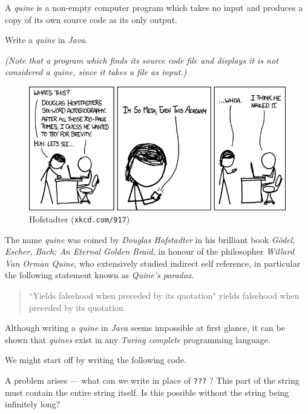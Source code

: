 

\problem A \textit{quine} is a non-empty computer program which takes no input and produces a copy of its own source code as its only
output.

Write a \textit{quine} in \textit{Java}.


\textit{(Note that a program which finds its source code file and displays it is not considered a \textit{quine}, since it takes a file as input.)}

\solution
\begin{figure}[h]
	\begin{center}
		\includegraphics[scale=0.5]{hofstadter.png}
	\end{center}
	\caption*{Hofstadter (\texttt{xkcd.com/917})}
	\label{fig:xkcd_hofstadter}
\end{figure}

The name \textit{quine} was coined by \textit{Douglas Hofstadter} in his brilliant book \textit{G\"odel, Escher, Bach: An Eternal Golden Braid}, in
honour of the philosopher \textit{Willard Van Orman Quine}, who extensively studied indirect self reference, in particular the following
statement known as \textit{Quine's paradox}.
\begin{quote}
	``Yields falsehood when preceded by its quotation" yields falsehood when preceded by its quotation.
\end{quote}

Although writing a \textit{quine} in \textit{Java} seems impossible at first glance, it can be shown that \textit{quines}
exist in any \textit{Turing complete} programming language.

We might start off by writing the following code.

A problem arises --- what can we write in place of \texttt{???} ? This part of the string must contain the entire string itself.
Is this possible without the string being infinitely long?

